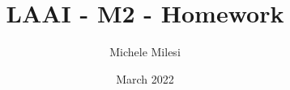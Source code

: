 \documentclass{article}
\title{LAAI - M2 - Homework}
\author{Michele Milesi}
\date{March 2022}
\begin{document}
\maketitle

\begin{abstract}
\end{abstract}










\end{document}

